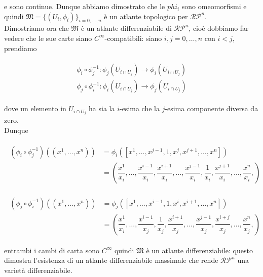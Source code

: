 e sono continue. Dunque abbiamo dimostrato che le $ phi_{i} $ sono omeomorfismi e quindi $ \mathfrak{M} = \{(U_{i},\phi_{i})\}_{i=0,\dots,n} $ è un atlante topologico per $ \mathcal{RP}^{n} $.\\
Dimostriamo ora che $ \mathfrak{M} $ è un atlante differenziabile di $ \mathcal{RP}^{n} $, cioè dobbiamo far vedere che le sue carte siano $ C^{\infty} $-compatibili: siano $ i,j=0,\dots,n $ con $ i<j $, prendiamo

\begin{align}
	\begin{split}
		\phi_{i} \circ \phi_{j}^{-1} : \phi_{j}(U_{i \cap U_{j}}) \to \phi_{i}(U_{i \cap U_{j}})\\
		\phi_{j} \circ \phi_{i}^{-1} : \phi_{i}(U_{i \cap U_{j}}) \to \phi_{j}(U_{i \cap U_{j}})
	\end{split}
\end{align}

dove un elemento in $ U_{i \cap U_{j}} $ ha sia la $ i $-esima che la $ j $-esima componente diversa da zero.\\
Dunque

\begin{align}
	\begin{split}
		(\phi_{i} \circ \phi_{j}^{-1})((x^{1},\dots,x^{n})) &= \phi_{i}([x^{1},\dots,x^{j-1},1,x^{j},x^{j+1},\dots,x^{n}])\\
		&= \left( \dfrac{x^{1}}{x_{i}}, \dots, \dfrac{x^{i-1}}{x_{i}}, \dfrac{x^{i+1}}{x_{i}}, \dots, \dfrac{x^{j-1}}{x_{i}}, \dfrac{1}{x_{i}}, \dfrac{x^{j+1}}{x_{i}}, \dots, \dfrac{x^{n}}{x_{i}}, \right)
	\end{split}
\end{align}

\begin{align}
	\begin{split}
		(\phi_{j} \circ \phi_{i}^{-1})((x^{1},\dots,x^{n})) &= \phi_{j}([x^{1},\dots,x^{i-1},1,x^{i},x^{i+1},\dots,x^{n}])\\
		&= \left( \dfrac{x^{1}}{x_{i}}, \dots, \dfrac{x^{i-1}}{x_{j}}, \dfrac{1}{x_{j}}, \dfrac{x^{i+1}}{x_{j}}, \dots, \dfrac{x^{j-1}}{x_{j}}, \dfrac{x^{i+j}}{x_{j}}, \dots, \dfrac{x^{n}}{x_{j}}, \right)
	\end{split}
\end{align}

entrambi i cambi di carta sono $ C^{\infty} $ quindi $ \mathfrak{M} $ è un atlante differenziabile: questo dimostra l'esistenza di un atlante differenziabile massimale che rende $ \mathcal{RP}^{n} $ una varietà differenziabile.

